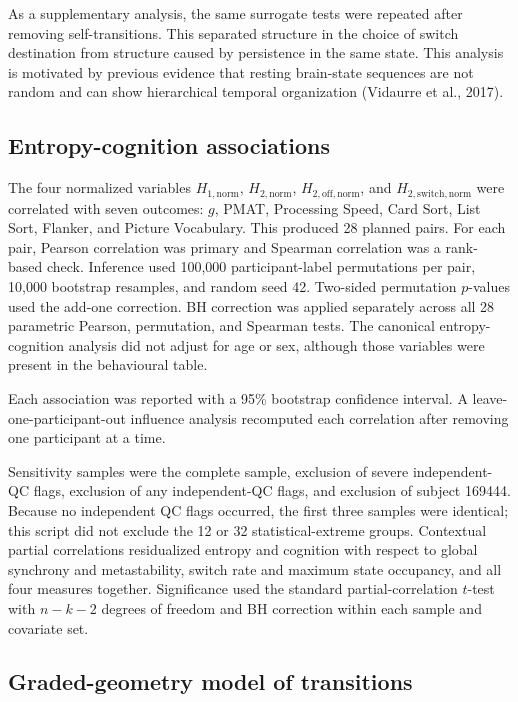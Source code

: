 \documentclass[12pt,a4paper]{report}
\begin{document}
As a supplementary analysis, the same surrogate tests were repeated after removing self-transitions. This separated structure in the choice of switch destination from structure caused by persistence in the same state. This analysis is motivated by previous evidence that resting brain-state sequences are not random and can show hierarchical temporal organization (Vidaurre et al., 2017).

\subsection{Entropy-cognition associations}

The four normalized variables $H_{1,\mathrm{norm}}$, $H_{2,\mathrm{norm}}$,
$H_{2,\mathrm{off,norm}}$, and $H_{2,\mathrm{switch,norm}}$ were correlated with seven
outcomes: $g$, PMAT, Processing Speed, Card Sort, List Sort, Flanker, and Picture Vocabulary.
This produced 28 planned pairs. For each pair, Pearson correlation was primary and Spearman correlation was a rank-based check.
Inference used 100,000 participant-label permutations per pair, 10,000 bootstrap resamples, and
random seed 42. Two-sided permutation $p$-values used the add-one correction. BH correction
was applied separately across all 28 parametric Pearson, permutation, and Spearman tests.
The canonical entropy-cognition analysis did not adjust for age or sex, although those variables
were present in the behavioural table.

Each association was reported with a 95\% bootstrap confidence interval. A leave-one-participant-out influence analysis recomputed each correlation after removing one participant at a time.

Sensitivity samples were the complete sample, exclusion of severe independent-QC flags,
exclusion of any independent-QC flags, and exclusion of subject 169444. Because no independent
QC flags occurred, the first three samples were identical; this script did not exclude the 12 or
32 statistical-extreme groups. Contextual partial correlations residualized entropy and cognition
with respect to global synchrony and metastability, switch rate and maximum state occupancy,
and all four measures together. Significance used the standard partial-correlation $t$-test with
$n-k-2$ degrees of freedom and BH correction within each sample and covariate set.

\subsection{Graded-geometry model of transitions}
\end{document}
